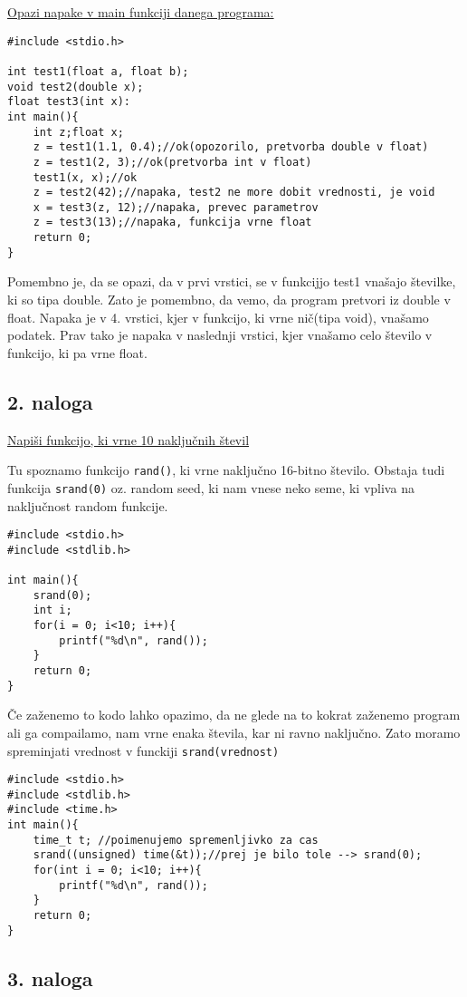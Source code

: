 \documentclass[a4paper, 12pt]{article}
\begin{document}
\underline{Opazi napake v main funkciji danega programa:}
\begin{lstlisting}
#include <stdio.h>

int test1(float a, float b);
void test2(double x);
float test3(int x):
int main(){
	int z;float x;
	z = test1(1.1, 0.4);//ok(opozorilo, pretvorba double v float)
	z = test1(2, 3);//ok(pretvorba int v float)
	test1(x, x);//ok
	z = test2(42);//napaka, test2 ne more dobit vrednosti, je void
	x = test3(z, 12);//napaka, prevec parametrov
	z = test3(13);//napaka, funkcija vrne float
	return 0;
}
\end{lstlisting}
Pomembno je, da se opazi, da v prvi vrstici, se v funkcijjo test1 vnašajo številke, ki so tipa double. Zato je pomembno, da vemo, da program pretvori iz double v float. Napaka je v 4. vrstici, kjer v funkcijo, ki vrne nič(tipa void), vnašamo podatek. Prav tako je napaka v naslednji vrstici, kjer vnašamo celo število v funkcijo, ki pa vrne float.

\subsection*{2. naloga}

\underline{Napiši funkcijo, ki vrne 10 naključnih števil}

Tu spoznamo funkcijo \lstinline|rand()|, ki vrne naključno 16-bitno število. Obstaja tudi funkcija \lstinline|srand(0)| oz. random seed, ki nam vnese neko seme, ki vpliva na naključnost random funkcije.

\begin{lstlisting}
#include <stdio.h>
#include <stdlib.h>

int main(){
	srand(0);
	int i;
	for(i = 0; i<10; i++){
		printf("%d\n", rand());
	}
	return 0;
}
\end{lstlisting}

Če zaženemo to kodo lahko opazimo, da ne glede na to kokrat zaženemo program ali ga compailamo, nam vrne enaka števila, kar ni ravno naključno. Zato moramo spreminjati vrednost v funckiji \lstinline|srand(vrednost)|

\begin{lstlisting}
#include <stdio.h>
#include <stdlib.h>
#include <time.h>
int main(){
	time_t t; //poimenujemo spremenljivko za cas
	srand((unsigned) time(&t));//prej je bilo tole --> srand(0);
	for(int i = 0; i<10; i++){
		printf("%d\n", rand());
	}
	return 0;
}
\end{lstlisting}

\subsection*{3. naloga}
\label{sec:5.3}
	
\end{document}
